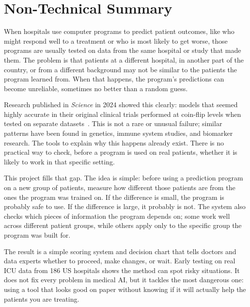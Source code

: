 \section{Non-Technical Summary}

When hospitals use computer programs to predict patient outcomes, like who might respond well to a treatment or who is most likely to get worse, those programs are usually tested on data from the same hospital or study that made them. The problem is that patients at a different hospital, in another part of the country, or from a different background may not be similar to the patients the program learned from. When that happens, the program's predictions can become unreliable, sometimes no better than a random guess.

Research published in \textit{Science} in 2024 showed this clearly: models that seemed highly accurate in their original clinical trials performed at coin-flip levels when tested on separate datasets~\cite{chekroud2024illusory}. This is not a rare or unusual failure; similar patterns have been found in genetics, immune system studies, and biomarker research. The tools to explain why this happens already exist. There is no practical way to check, before a program is used on real patients, whether it is likely to work in that specific setting.

This project fills that gap. The idea is simple: before using a prediction program on a new group of patients, measure how different those patients are from the ones the program was trained on. If the difference is small, the program is probably safe to use. If the difference is large, it probably is not. The system also checks which pieces of information the program depends on; some work well across different patient groups, while others apply only to the specific group the program was built for.

The result is a simple scoring system and decision chart that tells doctors and data experts whether to proceed, make changes, or wait. Early testing on real ICU data from 186 US hospitals shows the method can spot risky situations. It does not fix every problem in medical AI, but it tackles the most dangerous one: using a tool that looks good on paper without knowing if it will actually help the patients you are treating.